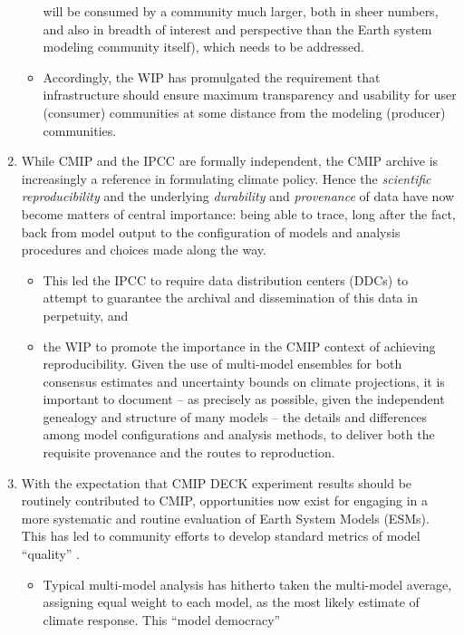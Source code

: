 \documentclass[gmd,manuscript]{copernicus}
\begin{document}
\begin{enumerate}
\begin{itemize}
    will be consumed by a community much larger, both in sheer
    numbers, and also in breadth of interest and perspective than the
    Earth system modeling community itself), which needs to be
    addressed.
  \item Accordingly, the WIP has promulgated the requirement that 
    infrastructure should ensure maximum transparency and usability
    for user (consumer) communities at some distance from the modeling
    (producer) communities.
  \end{itemize}
\item\label{repro} While CMIP and the IPCC are formally independent,
  the CMIP archive is increasingly a reference in formulating
  climate policy. Hence the \emph{scientific reproducibility}
  \citep{ref:collinstabak2014} and the underlying \emph{durability} and
  \emph{provenance} of data have now become matters of central
  importance: being able to trace, long after the fact, back from
  model output to the configuration of models and analysis procedures
  and choices made along the way.
  \begin{itemize}
  \item This led the IPCC to require data distribution centers (DDCs)
    to attempt to guarantee the archival and dissemination of this
    data in perpetuity, and
  \item the WIP to promote the importance in the CMIP context of
    achieving reproducibility. Given the use of multi-model ensembles
    for both consensus estimates and uncertainty bounds on climate
    projections, it is important to document -- as precisely as
    possible, given the independent genealogy and structure of many
    models -- the details and differences among model configurations
    and analysis methods, to deliver both the requisite provenance and
    the routes to reproduction.
  \end{itemize}
\item\label{analysis} With the expectation that CMIP DECK experiment
  results should be routinely contributed to CMIP, opportunities now
  exist for engaging in a more systematic and routine evaluation of
  Earth System Models (ESMs). This has led to community efforts to
  develop standard metrics of model ``quality''
  \citep{ref:eyringetal2016,ref:gleckleretal2016}.
  \begin{itemize}
  \item Typical multi-model analysis has hitherto taken the
    multi-model average, assigning equal weight to each model, as the
    most likely estimate of climate response. This ``model democracy''

\end{itemize}
\end{enumerate}
\end{document}
